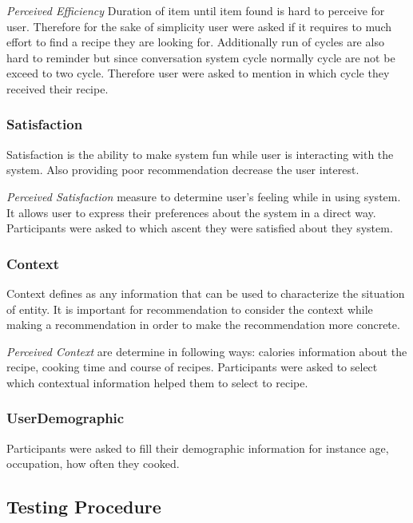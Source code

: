 \textit{Perceived Efficiency} Duration of item until item found is hard to perceive for user. Therefore for the sake of simplicity user were asked if it requires to much effort to find a recipe they are looking for. Additionally run of cycles are also hard to reminder but since conversation system cycle normally cycle are not be exceed to two cycle. Therefore user were asked to mention in which cycle they received their recipe. 

\subsubsection{Satisfaction}

Satisfaction is the ability to make system fun while user is interacting with the system. Also providing poor recommendation decrease the user interest.\newline

\textit{Perceived Satisfaction} measure to determine user’s feeling while in using system. It allows user to express their preferences about the system in a direct way. Participants were asked to which ascent they were satisfied about they system.

\subsubsection{Context}

Context defines as any information that can be used to characterize the situation of entity. It is important for recommendation to consider the context while making a recommendation in order to make the recommendation more concrete. \newline

\textit{Perceived Context} are determine in following ways: calories information about the recipe, cooking time and course of recipes. Participants were asked to select which contextual information helped them to select to recipe. 

\subsubsection{UserDemographic}

Participants were asked to fill their demographic information for instance age, occupation, how often they cooked. 

\subsection {Testing Procedure}

